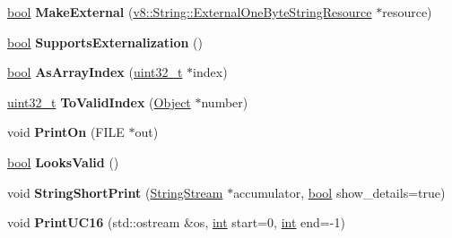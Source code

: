 \begin{DoxyCompactItemize}
\item 
\mbox{\label{classv8_1_1internal_1_1String_a649997bb50673e4d42ef7ddca0543439}} 
\mbox{\hyperlink{classbool}{bool}} {\bfseries Make\+External} (\mbox{\hyperlink{classv8_1_1String_1_1ExternalOneByteStringResource}{v8\+::\+String\+::\+External\+One\+Byte\+String\+Resource}} $\ast$resource)
\item 
\mbox{\label{classv8_1_1internal_1_1String_aebbbebbe83e66ca7fbd4764253aee22f}} 
\mbox{\hyperlink{classbool}{bool}} {\bfseries Supports\+Externalization} ()
\item 
\mbox{\label{classv8_1_1internal_1_1String_ac7d26984c3671ba8b7238b4b6df9ec15}} 
\mbox{\hyperlink{classbool}{bool}} {\bfseries As\+Array\+Index} (\mbox{\hyperlink{classuint32__t}{uint32\+\_\+t}} $\ast$index)
\item 
\mbox{\label{classv8_1_1internal_1_1String_a696c2da0192649a3b946dca16ca7b10e}} 
\mbox{\hyperlink{classuint32__t}{uint32\+\_\+t}} {\bfseries To\+Valid\+Index} (\mbox{\hyperlink{classv8_1_1internal_1_1Object}{Object}} $\ast$number)
\item 
\mbox{\label{classv8_1_1internal_1_1String_a13c247344e2d0ad2f85f97884dc7e789}} 
void {\bfseries Print\+On} (F\+I\+LE $\ast$out)
\item 
\mbox{\label{classv8_1_1internal_1_1String_a8d7708a3d1b99d34cb0bd52a80ae5e06}} 
\mbox{\hyperlink{classbool}{bool}} {\bfseries Looks\+Valid} ()
\item 
\mbox{\label{classv8_1_1internal_1_1String_a71ef428c87d6704414c4a3800804b50f}} 
void {\bfseries String\+Short\+Print} (\mbox{\hyperlink{classv8_1_1internal_1_1StringStream}{String\+Stream}} $\ast$accumulator, \mbox{\hyperlink{classbool}{bool}} show\+\_\+details=true)
\item 
\mbox{\label{classv8_1_1internal_1_1String_aea55a02f85df72a16ca12a02cff5cd2b}} 
void {\bfseries Print\+U\+C16} (std\+::ostream \&os, \mbox{\hyperlink{classint}{int}} start=0, \mbox{\hyperlink{classint}{int}} end=-\/1)

\end{DoxyCompactItemize}
